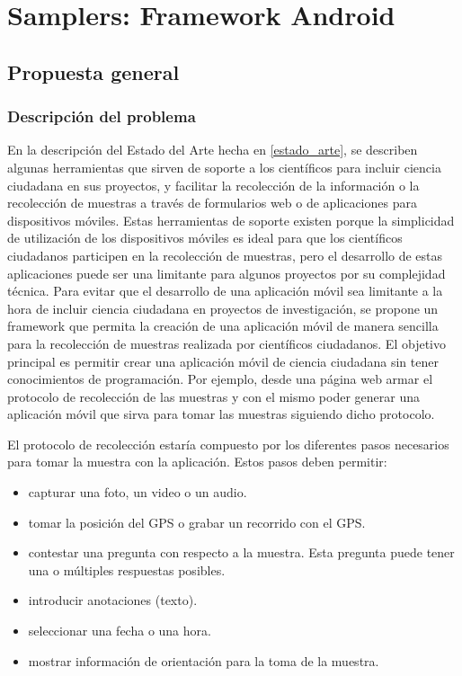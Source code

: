 \chapter{Samplers: Framework Android} \label{cap:samplers}

\section{Propuesta general}

\subsection{Descripción del problema}
En la descripción del Estado del Arte hecha en \ref{estado_arte}, se describen algunas herramientas que sirven de soporte a los científicos para incluir ciencia ciudadana en sus proyectos, y facilitar la recolección de la información o la recolección de muestras a través de formularios web o de aplicaciones para dispositivos móviles. Estas herramientas de soporte existen porque la simplicidad de utilización de los dispositivos móviles es ideal para que los científicos ciudadanos participen en la recolección de muestras, pero el desarrollo de estas aplicaciones puede ser una limitante para algunos proyectos por su complejidad técnica. \cite{kim2013sensr}
Para evitar que el desarrollo de una aplicación móvil sea limitante a la hora de incluir ciencia ciudadana en proyectos de investigación, se propone un framework que permita la creación de una aplicación móvil de manera sencilla para la recolección de muestras realizada por científicos ciudadanos.
El objetivo principal es permitir crear una aplicación móvil de ciencia ciudadana sin tener conocimientos de programación. Por ejemplo, desde una página web armar el protocolo de recolección de las muestras y con el mismo poder generar una aplicación móvil que sirva para tomar las muestras siguiendo dicho protocolo.

El protocolo de recolección estaría compuesto por los diferentes pasos necesarios para tomar la muestra con la aplicación. Estos pasos deben permitir:
\begin{itemize}
\item capturar una foto, un video o un audio.
\item tomar la posición del GPS o grabar un recorrido con el GPS.
\item contestar una pregunta con respecto a la muestra. Esta pregunta puede tener una o múltiples respuestas posibles.
\item introducir anotaciones (texto).
\item seleccionar una fecha o una hora.
\item mostrar información de orientación para la toma de la muestra.
\end{itemize}

